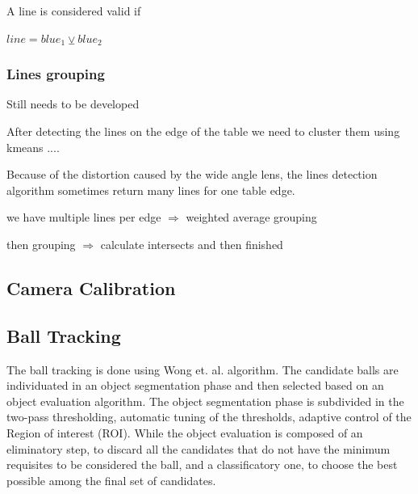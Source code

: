 \documentclass[a4paper]{article}
\begin{document}
A line is considered valid if

$line = blue_{1} \veebar blue_{2}$  

\subsubsection{Lines grouping}

Still needs to be developed 

After detecting the lines on the edge of the table we need to cluster them using kmeans ....

Because of the distortion caused by the wide angle lens, the lines detection algorithm sometimes return many lines for one table edge.

we have multiple lines per edge $\Rightarrow$  weighted average grouping

then grouping $\Rightarrow$ calculate intersects and then finished

\subsection{Camera Calibration}
\subsection{Ball Tracking}

The ball tracking is done using Wong et. al.\cite{Wong} algorithm. The candidate balls are individuated in an object segmentation phase and then selected based on an object evaluation algorithm. The object segmentation phase is subdivided in the two-pass thresholding, automatic tuning of the thresholds, adaptive control of the Region of interest (ROI). While the object evaluation is composed of an eliminatory step, to discard all the candidates that do not have the minimum requisites to be considered the ball, and a classificatory one, to choose the best possible among the final set of candidates.
\end{document}
